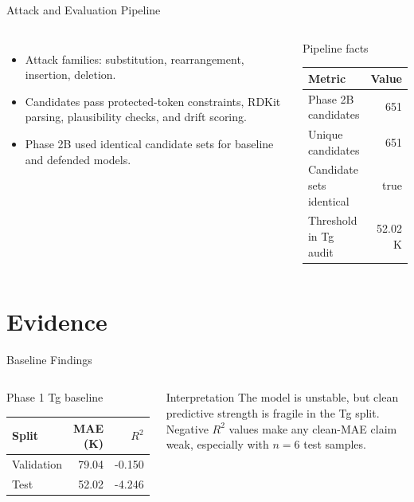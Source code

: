 \documentclass[aspectratio=169,10pt]{beamer}
\begin{document}
\begin{frame}{Attack and Evaluation Pipeline}
\begin{columns}[T,totalwidth=\textwidth]
\begin{itemize}
  \item Attack families: substitution, rearrangement, insertion, deletion.
  \item Candidates pass protected-token constraints, RDKit parsing, plausibility checks, and drift scoring.
  \item Phase 2B used identical candidate sets for baseline and defended models.
\end{itemize}
\begin{block}{Pipeline facts}
\begin{tabular}{@{}lr@{}}
\toprule
Metric & Value\\
\midrule
Phase 2B candidates & 651\\
Unique candidates & 651\\
Candidate sets identical & true\\
Threshold in Tg audit & 52.02 K\\
\bottomrule
\end{tabular}
\end{block}
\end{columns}
\end{frame}

\section{Evidence}

\begin{frame}{Baseline Findings}
\begin{columns}[T,totalwidth=\textwidth]
\begin{block}{Phase 1 Tg baseline}
\begin{tabular}{@{}lrr@{}}
\toprule
Split & MAE (K) & $R^2$\\
\midrule
Validation & 79.04 & -0.150\\
Test & 52.02 & -4.246\\
\bottomrule
\end{tabular}
\end{block}
\begin{alertblock}{Interpretation}
The model is unstable, but clean predictive strength is fragile in the Tg split. Negative $R^2$ values make any clean-MAE claim weak, especially with $n=6$ test samples.
\end{alertblock}
\end{columns}
\end{frame}
\end{document}
